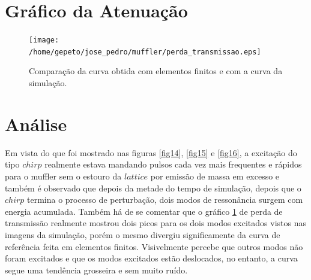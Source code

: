 \newpage
\section{Gráfico da Atenuação}
\begin{figure}[h!]
    \centering
    \hspace{-1.5cm}
    \texttt{[image: /home/gepeto/jose\_pedro/muffler/perda\_transmissao.eps]}
    \caption{Comparação da curva obtida com elementos finitos e com a curva da simulação.}
    \label{fig17}
\end{figure}

\section{Análise}
Em vista do que foi mostrado nas figuras \ref{fig14}, \ref{fig15} e \ref{fig16}, a excitação do tipo $chirp$ realmente estava mandando pulsos cada vez mais frequentes e rápidos para o muffler sem o estouro da $lattice$ por emissão de massa em excesso e também é observado que depois da metade do tempo de simulação, depois que o $chirp$ termina o processo de perturbação, dois modos de ressonância surgem com energia acumulada. Também há de se comentar que o gráfico \ref{fig17} de perda de transmissão realmente mostrou dois picos para os dois modos excitados vistos nas imagens da simulação, porém o mesmo divergiu significamente da curva de referência feita em elementos finitos. Visivelmente percebe que outros modos não foram excitados e que os modos excitados estão deslocados, no entanto, a curva segue uma tendência grosseira e sem muito ruído.
